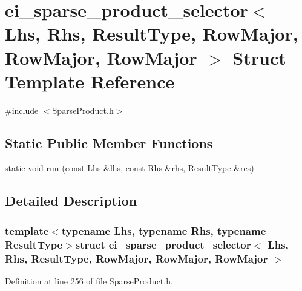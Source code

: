 \hypertarget{structei__sparse__product__selector_3_01_lhs_00_01_rhs_00_01_result_type_00_01_row_major_00_01_row_major_00_01_row_major_01_4}{\section{ei\-\_\-sparse\-\_\-product\-\_\-selector$<$ Lhs, Rhs, Result\-Type, Row\-Major, Row\-Major, Row\-Major $>$ Struct Template Reference}
\label{structei__sparse__product__selector_3_01_lhs_00_01_rhs_00_01_result_type_00_01_row_major_00_01_row_major_00_01_row_major_01_4}
}


{\ttfamily \#include $<$Sparse\-Product.\-h$>$}

\subsection*{Static Public Member Functions}
\begin{DoxyCompactItemize}
\item 
static \hyperlink{group___u_a_v_objects_plugin_ga444cf2ff3f0ecbe028adce838d373f5c}{void} \hyperlink{structei__sparse__product__selector_3_01_lhs_00_01_rhs_00_01_result_type_00_01_row_major_00_01_row_major_00_01_row_major_01_4_a63bd4b5e7420d8be42627e0ff908226d}{run} (const Lhs \&lhs, const Rhs \&rhs, Result\-Type \&\hyperlink{glext_8h_a1dbb21208b9047cc8031ca9c840d3c2f}{res})
\end{DoxyCompactItemize}


\subsection{Detailed Description}
\subsubsection*{template$<$typename Lhs, typename Rhs, typename Result\-Type$>$struct ei\-\_\-sparse\-\_\-product\-\_\-selector$<$ Lhs, Rhs, Result\-Type, Row\-Major, Row\-Major, Row\-Major $>$}



Definition at line 256 of file Sparse\-Product.\-h.



